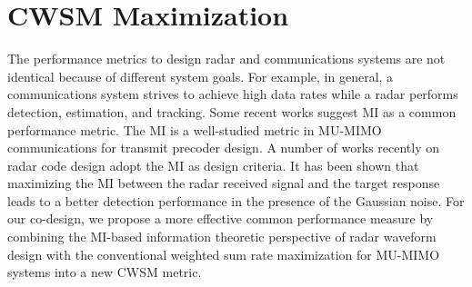 \documentclass[10pt,journal]{IEEEtran}
\newcommand{\ith}[1]    {{#1}^{\underline{\text{th}}}}
\newcommand{\rr}{_\mathrm{r}}
\newcommand{\rnr}{_{\mathrm{r},n_\mathrm{r}}}
\theoremstyle{definition}
\begin{document}
\section{CWSM Maximization}
\label{sec: formulation}
The performance metrics to design radar and communications systems are not identical because of different system goals. For example, in general, a communications system strives to achieve high data rates while a radar performs detection, estimation, and tracking. Some recent works \cite{alaee2020information,dokhanchi2020multi,ni2020waveform} suggest MI as a common performance metric. The MI is a well-studied metric in MU-MIMO communications for transmit precoder design\cite{Luo2011IterativeWMMSE}. A number of works recently on radar code design adopt the MI as design criteria\cite{Colornoise_waveform,Jammer_game,NaghshTSP2017,JianLi2019,20MISTAP}. %
It has been shown \cite{Jammer_game} that maximizing the MI between the radar received signal and the target response leads to a better detection performance in the presence of the Gaussian noise. For our co-design, we propose a more effective common performance measure by combining the MI-based information theoretic perspective of radar waveform design with the conventional weighted sum rate maximization for MU-MIMO systems into a new CWSM metric.
	
\end{document}
